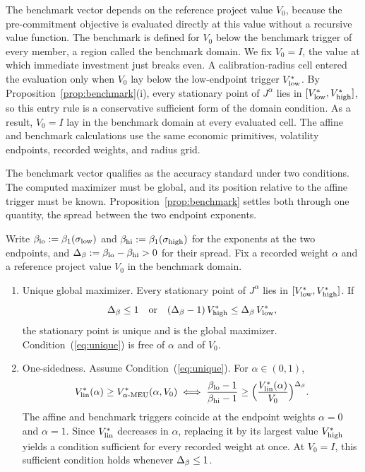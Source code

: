 The benchmark vector depends on the reference project value $V_0$, because the pre-commitment objective is evaluated directly at this value without a recursive value function. The benchmark is defined for $V_0$ below the benchmark trigger of every member, a region called the benchmark domain. We fix $V_0=I$, the value at which immediate investment just breaks even. A calibration-radius cell entered the evaluation only when $V_0$ lay below the low-endpoint trigger $V^{*}_{\mathrm{low}}$. By Proposition~\ref{prop:benchmark}(i), every stationary point of $J^{\alpha}$ lies in $[V^{*}_{\mathrm{low}},V^{*}_{\mathrm{high}}]$, so this entry rule is a conservative sufficient form of the domain condition. As a result, $V_0=I$ lay in the benchmark domain at every evaluated cell. The affine and benchmark calculations use the same economic primitives, volatility endpoints, recorded weights, and radius grid.

The benchmark vector qualifies as the accuracy standard under two conditions. The computed maximizer must be global, and its position relative to the affine trigger must be known. Proposition~\ref{prop:benchmark} settles both through one quantity, the spread between the two endpoint exponents.

\begin{proposition}\label{prop:benchmark}
Write $\beta_{\mathrm{lo}}:=\beta_1(\sigma_{\mathrm{low}})$ and $\beta_{\mathrm{hi}}:=\beta_1(\sigma_{\mathrm{high}})$ for the exponents at the two endpoints, and $\Delta_{\beta}:=\beta_{\mathrm{lo}}-\beta_{\mathrm{hi}}>0$ for their spread. Fix a recorded weight $\alpha$ and a reference project value $V_0$ in the benchmark domain.
\begin{enumerate}
\item[(i)] Unique global maximizer. Every stationary point of $J^{\alpha}$ lies in $[V^{*}_{\mathrm{low}},V^{*}_{\mathrm{high}}]$. If
\begin{equation}
\Delta_{\beta}\le 1\quad\text{or}\quad(\Delta_{\beta}-1)\,V^{*}_{\mathrm{high}}\le\Delta_{\beta}\,V^{*}_{\mathrm{low}},
\label{eq:unique}
\end{equation}
the stationary point is unique and is the global maximizer. Condition~(\ref{eq:unique}) is free of $\alpha$ and of $V_0$.
\item[(ii)] One-sidedness. Assume Condition~(\ref{eq:unique}). For $\alpha\in(0,1)$,
\begin{equation}
V^{*}_{\mathrm{lin}}(\alpha)\ge V^{*}_{\alpha\text{-MEU}}(\alpha,V_0)\iff\frac{\beta_{\mathrm{lo}}-1}{\beta_{\mathrm{hi}}-1}\ge\Bigl(\frac{V^{*}_{\mathrm{lin}}(\alpha)}{V_0}\Bigr)^{\Delta_{\beta}}.
\label{eq:onesided}
\end{equation}
The affine and benchmark triggers coincide at the endpoint weights $\alpha=0$ and $\alpha=1$. Since $V^{*}_{\mathrm{lin}}$ decreases in $\alpha$, replacing it by its largest value $V^{*}_{\mathrm{high}}$ yields a condition sufficient for every recorded weight at once. At $V_0=I$, this sufficient condition holds whenever $\Delta_{\beta}\le1$.
\end{enumerate}
\end{proposition}


